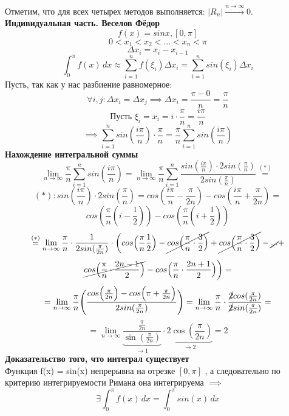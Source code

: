 \documentclass{beamer}
\begin{document}
	Отметим, что для всех четырех методов выполняется: \(|R_n| \xrightarrow{n \to \infty}{} 0\).
	\newpage
	\large \textbf{\textcolor{structure.fg}{Индивидуальная часть. Веселов Фёдор}}\\
	\[f(x) = sinx, [0, \pi]\]
	\[0 < x_1 < x_2 < ... < x_n < \pi\]
	\[\Delta x_i = x_i - x_{i-1}\]
	\[ \int_0^\pi f(x) \, dx \approx \sum_{i=1}^n f(\xi_i)\Delta x_i = 
	\sum_{i=1}^n sin(\xi_i)\Delta x_i \]
	\newpage
	Пусть, так как у нас разбиение равномерное:
	\[\forall i,j: 
	\Delta x_i = \Delta x_j \implies \Delta x_i = 
	\frac{\pi - 0}{n} = \frac{\pi}{n}\]
	\[\text{Пусть } \xi_i = x_i = i\cdot\frac{\pi}{n} = \frac{i\pi}{n}\]
	\[\implies \sum_{i=1}^n sin(\frac{i\pi}{n})\cdot \frac{\pi}{n}
	= \frac{\pi}{n}\sum_{i=1}^n sin(\frac{i\pi}{n})\]
	\newpage
	\textbf{Нахождение интегральной суммы}
	\[
	\lim_{n \to \infty} \frac{\pi}{n}\sum_{i=1}^n sin(\frac{i\pi}{n}) =
	\lim_{n \to \infty} \frac{\pi}{n}\sum_{i=1}^n \frac{sin(\frac{i\pi}{n})\cdot2sin(\frac{\pi}{n})}{2sin(\frac{\pi}{n})} \overset{(*)}{=}
	\]
	\[
	(*): sin(\frac{i\pi}{n})\cdot2sin(\frac{\pi}{n}) = 
	cos(\frac{i\pi}{n} - \frac{\pi}{2n}) - cos(\frac{i\pi}{n} + \frac{\pi}{2n})
	=\]\[ cos(\frac{\pi}{n}(i-\frac{1}{2})) - cos(\frac{\pi}{n}(i+\frac{1}{2}))
	\]
	\[
	\overset{(*)}{=} \lim_{n \to \infty} \frac{\pi}{n}\cdot\frac{1}{2sin(\frac{\pi}{2n})}\cdot
	\biggl(cos\Bigl(\frac{\pi}{n}\frac{1}{2}\Bigr) - \cancel{cos\Bigl(\frac{\pi}{n}\cdot\frac{3}{2}\Bigr)} + \cancel{cos\Bigl(\frac{\pi}{n}\cdot\frac{3}{2}\Bigr)}
	- \cancel{...} + \]\[\cancel{cos\Bigl(\frac{\pi}{n}\cdot\frac{2n-1}{2}\Bigr)} - cos\Bigl(\frac{\pi}{n}\cdot\frac{2n+1}{2}\Bigr)\biggr) =
	\]
	\newpage
	\[
	= \lim_{n \to \infty} \frac{\pi}{n}\Biggl( 
	\frac{cos\Bigl(\frac{\pi}{2n}\Bigr) - cos\Bigl(\pi+\frac{\pi}{2n}\Bigr)}{2sin(\frac{\pi}{2n})} \Biggr) =
	\lim_{n \to \infty} \frac{\pi}{n} \cdot 
	\frac{\cancel{2}cos(\frac{\pi}{2n})}{\cancel{2}sin(\frac{\pi}{2n})}
	=\]\[ = \lim_{n \to \infty} \underbrace{\frac{\frac{\pi}{2n}}{\sin(\frac{\pi}{2n})}}_{\to1} \cdot 
	\underbrace{2\cos\left(\frac{\pi}{2n}\right)}_{\to 2} = 2
	\]
	\newpage
	\textbf{Доказательство того, что интеграл существует}\\
	Функция f(x) = sin(x) непрерывна на отрезке  $[0,\pi]$ , а следовательно по критерию интегрируемости Римана она интегрируема $\implies $
	\[\exists \int_0^\pi f(x) \, dx =  \int_0^\pi sin(x) \, dx \]
	
\end{document}
